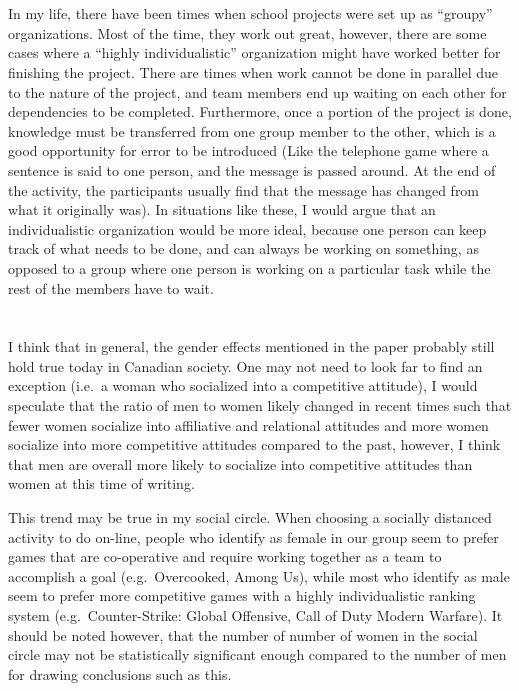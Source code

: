 \documentclass[letterpaper,12pt]{article}
\begin{document}
  \section{}
  In my life, there have been times when school projects were set up as
  ``groupy'' organizations.  Most of the time, they work out great, however,
  there are some cases where a ``highly individualistic'' organization  might
  have worked better for finishing the project. There are times when work
  cannot be done in parallel due to the nature of the project, and team members
  end up waiting on each other for dependencies to be completed. Furthermore,
  once a portion of the project is done, knowledge must be transferred from one
  group member to the other, which is a good opportunity for error to be
  introduced (Like the telephone game where a sentence is said to one person,
  and the message is passed around. At the end of the activity, the
  participants usually find that the message has changed from what it
  originally was). In situations like these, I would argue that an
  individualistic organization would be more ideal, because one person can keep
  track of what needs to be done, and can always be working on something, as
  opposed to a group where one person is working on a particular task while
  the rest of the members have to wait. 


  \section{}
  I think that in general, the gender effects mentioned in the paper probably
  still hold true today in Canadian society. One may not need to look far to
  find an exception (i.e.\ a woman who socialized into a competitive attitude),
  I would speculate that the ratio of men to women likely changed in recent
  times such that fewer women socialize into affiliative and relational
  attitudes and more women socialize into more competitive attitudes compared
  to the past, however, I think that men are overall more likely to socialize
  into competitive attitudes than women at this time of writing.

  This trend may be true in my social circle.  When choosing a socially
  distanced activity to do on-line, people who identify as female in our group
  seem to prefer games that are co-operative and require working together as a
  team to accomplish a goal (e.g.\ Overcooked, Among Us), while most who
  identify as male seem to prefer more competitive games with a highly
  individualistic ranking system (e.g.\ Counter-Strike: Global Offensive, Call
  of Duty Modern Warfare). It should be noted however, that the number of
  number of women in the social circle may not be statistically significant
  enough compared to the number of men for drawing conclusions such as this.
\end{document}
